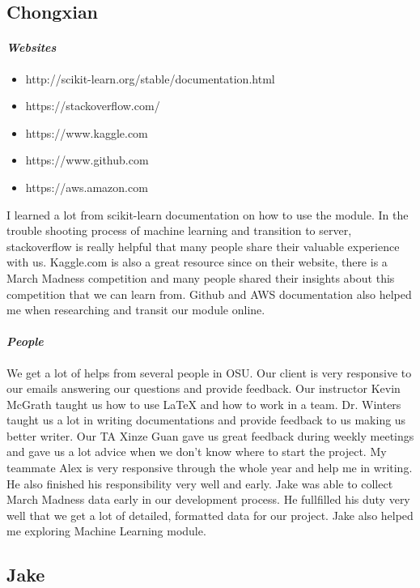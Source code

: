 \documentclass[onecolumn, draftclsnofoot,10pt, compsoc]{IEEEtran}
\begin{document}
\subsection{Chongxian}
\paragraph{\emph{Websites}}
\begin{itemize}
\item http://scikit-learn.org/stable/documentation.html
\item https://stackoverflow.com/ 
\item https://www.kaggle.com
\item https://www.github.com
\item https://aws.amazon.com
\end{itemize}
I learned a lot from scikit-learn documentation on how to use the module. In the trouble shooting process of machine learning and transition to server, stackoverflow is really helpful that many people share their valuable experience with us. Kaggle.com is also a great resource since on their website, there is a March Madness competition and many people shared their insights about this competition that we can learn from. Github and AWS documentation also helped me when researching and transit our module online.
\paragraph{\emph{People}}
We get a lot of helps from several people in OSU. Our client is very responsive to our emails answering our questions and provide feedback. Our instructor Kevin McGrath taught us how to use LaTeX and how to work in a team. Dr. Winters taught us a lot in writing documentations and provide feedback to us making us better writer. Our TA Xinze Guan gave us great feedback during weekly meetings and gave us a lot advice when we don't know where to start the project. My teammate Alex is very responsive through the whole year and help me in writing. He also finished his responsibility very well and early. Jake was able to collect March Madness data early in our development process. He fullfilled his duty very well that we get a lot of detailed, formatted data for our project. Jake also helped me exploring Machine Learning module.


\subsection{Jake}
\end{document}
